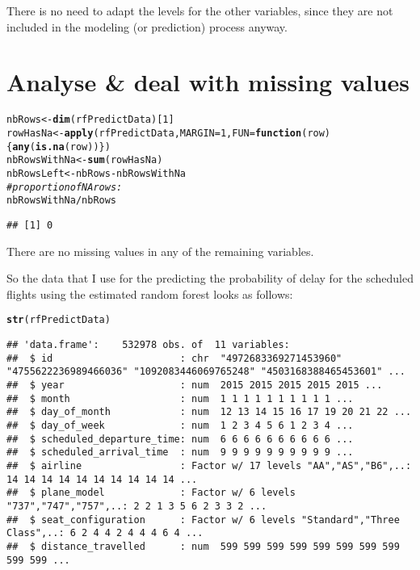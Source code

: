 \documentclass{article}\usepackage[]{graphicx}\usepackage[]{color}
\makeatletter
\newcommand{\hlnum}[1]{\textcolor[rgb]{0.686,0.059,0.569}{#1}}%
\newcommand{\hlcom}[1]{\textcolor[rgb]{0.678,0.584,0.686}{\textit{#1}}}%
\newcommand{\hlopt}[1]{\textcolor[rgb]{0,0,0}{#1}}%
\newcommand{\hlstd}[1]{\textcolor[rgb]{0.345,0.345,0.345}{#1}}%
\newcommand{\hlkwa}[1]{\textcolor[rgb]{0.161,0.373,0.58}{\textbf{#1}}}%
\newcommand{\hlkwb}[1]{\textcolor[rgb]{0.69,0.353,0.396}{#1}}%
\newcommand{\hlkwc}[1]{\textcolor[rgb]{0.333,0.667,0.333}{#1}}%
\newcommand{\hlkwd}[1]{\textcolor[rgb]{0.737,0.353,0.396}{\textbf{#1}}}%
\newenvironment{kframe}{%
 \def\at@end@of@kframe{}%
 \ifinner\ifhmode%
  \def\at@end@of@kframe{\end{minipage}}%
  \begin{minipage}{\columnwidth}%
 \fi\fi%
 \def\FrameCommand##1{\hskip\@totalleftmargin \hskip-\fboxsep
 \colorbox{shadecolor}{##1}\hskip-\fboxsep
     \hskip-\linewidth \hskip-\@totalleftmargin \hskip\columnwidth}%
 \MakeFramed {\advance\hsize-\width
   \@totalleftmargin\z@ \linewidth\hsize
   \@setminipage}}%
 {\par\unskip\endMakeFramed%
 \at@end@of@kframe}
\newenvironment{knitrout}{}{} %
\makeatother
\begin{document}
There is no need to adapt the levels for the other variables, since they are not included in the modeling (or prediction) process anyway.

\section{Analyse \& deal with missing values}

\begin{knitrout}
\color{fgcolor}\begin{kframe}
\begin{alltt}
\hlstd{nbRows} \hlkwb{<-} \hlkwd{dim}\hlstd{(rfPredictData)[}\hlnum{1}\hlstd{]}
\hlstd{rowHasNa} \hlkwb{<-} \hlkwd{apply}\hlstd{(rfPredictData,} \hlkwc{MARGIN}\hlstd{=}\hlnum{1}\hlstd{,} \hlkwc{FUN}\hlstd{=}\hlkwa{function}\hlstd{(}\hlkwc{row}\hlstd{)\{} \hlkwd{any}\hlstd{(}\hlkwd{is.na}\hlstd{(row)) \})}
\hlstd{nbRowsWithNa} \hlkwb{<-} \hlkwd{sum}\hlstd{(rowHasNa)}
\hlstd{nbRowsLeft} \hlkwb{<-} \hlstd{nbRows} \hlopt{-} \hlstd{nbRowsWithNa}
\hlcom{# proportion of NA rows:}
\hlstd{nbRowsWithNa} \hlopt{/} \hlstd{nbRows}
\end{alltt}
\begin{verbatim}
## [1] 0
\end{verbatim}
\end{kframe}
\end{knitrout}

There are no missing values in any of the remaining variables.

So the data that I use for the predicting the probability of delay for the scheduled flights using the estimated random forest looks as follows:
\begin{knitrout}
\color{fgcolor}\begin{kframe}
\begin{alltt}
\hlkwd{str}\hlstd{(rfPredictData)}
\end{alltt}
\begin{verbatim}
## 'data.frame':	532978 obs. of  11 variables:
##  $ id                      : chr  "4972683369271453960" "4755622236989466036" "1092083446069765248" "4503168388465453601" ...
##  $ year                    : num  2015 2015 2015 2015 2015 ...
##  $ month                   : num  1 1 1 1 1 1 1 1 1 1 ...
##  $ day_of_month            : num  12 13 14 15 16 17 19 20 21 22 ...
##  $ day_of_week             : num  1 2 3 4 5 6 1 2 3 4 ...
##  $ scheduled_departure_time: num  6 6 6 6 6 6 6 6 6 6 ...
##  $ scheduled_arrival_time  : num  9 9 9 9 9 9 9 9 9 9 ...
##  $ airline                 : Factor w/ 17 levels "AA","AS","B6",..: 14 14 14 14 14 14 14 14 14 14 ...
##  $ plane_model             : Factor w/ 6 levels "737","747","757",..: 2 2 1 3 5 6 2 3 3 2 ...
##  $ seat_configuration      : Factor w/ 6 levels "Standard","Three Class",..: 6 2 4 4 2 4 4 4 6 4 ...
##  $ distance_travelled      : num  599 599 599 599 599 599 599 599 599 599 ...
\end{verbatim}
\end{kframe}
\end{knitrout}
\end{document}
